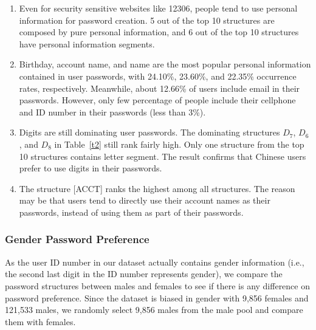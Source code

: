 \begin{enumerate}[leftmargin=*]
\item Even for security sensitive websites like 12306, people tend to
  use personal information for password creation. 5 out of the top 10
  structures are composed by pure personal information, and 6 out of
  the top 10 structures have personal information segments.

\item Birthday, account name, and name are the most popular personal
  information contained in user passwords, with 24.10\%, 23.60\%, and
  22.35\% occurrence rates, respectively. Meanwhile, about 12.66\% of
  users include email in their passwords. However, only few percentage
  of people include their cellphone and ID number in their passwords
  (less than 3\%).

\item Digits are still dominating user passwords. The dominating
  structures $D_7$, $D_6$, and $D_8$ in Table~\ref{t2} still rank
  fairly high. Only one structure from the top 10 structures contains
  letter segment. The result confirms that Chinese users prefer to use
  digits in their passwords.

\item %
The structure [ACCT] ranks the highest among all structures. The
reason may be that users tend to directly use their account names as
their passwords, instead of using them as part of their passwords.
\end{enumerate}

\subsubsection{Gender Password Preference}
\label{genderdifference}

As the user ID number in our dataset actually contains gender
information (i.e., the second last digit in the ID number represents
gender), we compare the password structures between males and females
to see if there is any difference on password preference. Since the
dataset is biased in gender with 9,856 females and 121,533 males, we
randomly select 9,856 males from the male pool and compare them with
females.

